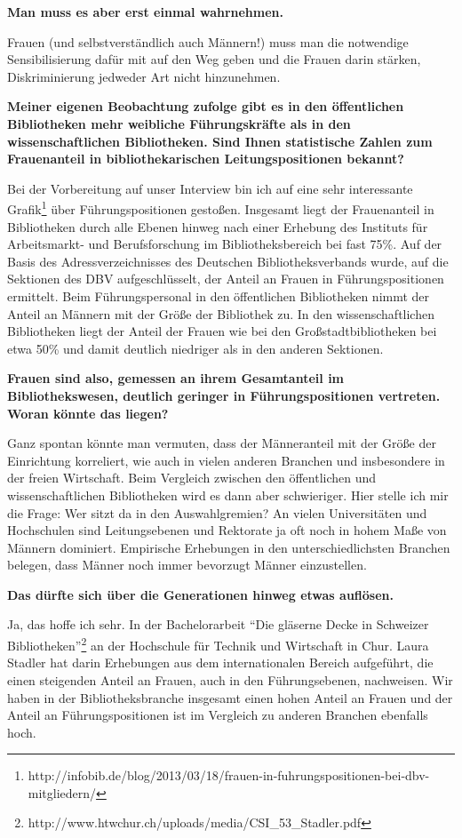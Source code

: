\documentclass[a4paper,
fontsize=11pt,
oneside,
numbers=noperiodatend,
parskip=half-,
bibliography=totoc,
final
]{scrartcl}
\begin{document}
\textbf{Man muss es aber erst einmal wahrnehmen.}

Frauen (und selbstverständlich auch Männern!) muss man die notwendige
Sensibilisierung dafür mit auf den Weg geben und die Frauen darin
stärken, Diskriminierung jedweder Art nicht hinzunehmen.~

\textbf{Meiner eigenen Beobachtung zufolge gibt es in den öffentlichen
Bibliotheken mehr weibliche Führungskräfte als in den wissenschaftlichen
Bibliotheken. Sind Ihnen statistische Zahlen zum Frauenanteil in
bibliothekarischen Leitungspositionen bekannt?}

Bei der Vorbereitung auf unser Interview bin ich auf eine sehr
interessante Grafik\footnote{http://infobib.de/blog/2013/03/18/frauen-in-fuhrungspositionen-bei-dbv-mitgliedern/}
über Führungspositionen gestoßen. Insgesamt liegt der Frauenanteil in
Bibliotheken durch alle Ebenen hinweg nach einer Erhebung des Instituts
für Arbeitsmarkt- und Berufsforschung im Bibliotheksbereich bei fast
75\%. Auf der Basis des Adressverzeichnisses des Deutschen
Bibliotheksverbands wurde, auf die Sektionen des DBV aufgeschlüsselt,
der Anteil an Frauen in Führungspositionen ermittelt. Beim
Führungspersonal in den öffentlichen Bibliotheken nimmt der Anteil an
Männern mit der Größe der Bibliothek zu. In den wissenschaftlichen
Bibliotheken liegt der Anteil der Frauen wie bei den
Großstadtbibliotheken bei etwa 50\% und damit deutlich niedriger als in
den anderen Sektionen.~

\textbf{Frauen sind also, gemessen an ihrem Gesamtanteil im
Bibliothekswesen, deutlich geringer in Führungspositionen vertreten.
Woran könnte das liegen?}

Ganz spontan könnte man vermuten, dass der Männeranteil mit der Größe
der Einrichtung korreliert, wie auch in vielen anderen Branchen und
insbesondere in der freien Wirtschaft. Beim Vergleich zwischen den
öffentlichen und~ wissenschaftlichen Bibliotheken wird es dann aber
schwieriger. Hier stelle ich mir die Frage: Wer sitzt da in den
Auswahlgremien? An vielen Universitäten und Hochschulen sind
Leitungsebenen und Rektorate ja oft noch in hohem Maße von Männern
dominiert. Empirische Erhebungen in den unterschiedlichsten Branchen
belegen, dass Männer noch immer bevorzugt Männer einzustellen.~

\textbf{Das dürfte sich über die Generationen hinweg etwas auflösen.~}

Ja, das hoffe ich sehr. In der Bachelorarbeit \enquote{Die gläserne
Decke in Schweizer Bibliotheken}\footnote{http://www.htwchur.ch/uploads/media/CSI\_53\_Stadler.pdf}
an der Hochschule für Technik und Wirtschaft in Chur. Laura Stadler hat
darin Erhebungen aus dem internationalen Bereich aufgeführt, die einen
steigenden Anteil an Frauen, auch in den Führungsebenen, nachweisen. Wir
haben in der Bibliotheksbranche insgesamt einen hohen Anteil an Frauen
und der Anteil an Führungspositionen ist im Vergleich zu anderen
Branchen ebenfalls hoch.~
\end{document}
